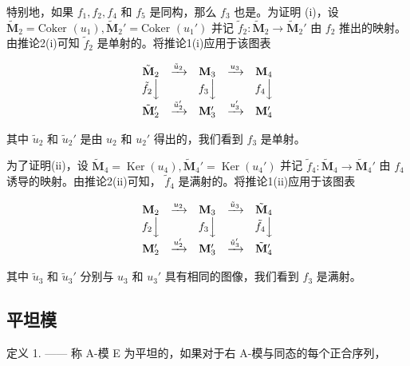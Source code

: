 特别地，如果 \(f_1, f_2, f_4\) 和 \(f_5\) 是同构，那么 \(f_3\) 也是。为证明 (i)，设 \(\tilde{\mathbf{M}}_2 = \text{Coker } (u_1), \tilde{\mathbf{M}}_2' = \text{Coker } (u_1')\) 并记 \(\tilde{f}_2: \tilde{\mathbf{M}}_2 \to \tilde{\mathbf{M}}_2'\) 由 \(f_2\) 推出的映射。由推论2(i)可知 \(\tilde{f}_2\) 是单射的。将推论1(i)应用于该图表

\[
\begin{array}{c c c c c} \tilde {\mathbf {M}} _ {2} & \xrightarrow {\tilde {u} _ {2}} & \mathbf {M} _ {3} & \xrightarrow {u _ {3}} & \mathbf {M} _ {4} \\ \tilde {f} _ {2} \Big \downarrow & & f _ {3} \Big \downarrow & & f _ {4} \Big \downarrow \\ \tilde {\mathbf {M}} _ {2} ^ {\prime} & \xrightarrow {\tilde {u} _ {2} ^ {\prime}} & \mathbf {M} _ {3} ^ {\prime} & \xrightarrow {u _ {3} ^ {\prime}} & \mathbf {M} _ {4} ^ {\prime} \end{array}
\]

其中 \(\tilde{u}_2\) 和 \(\tilde{u}_2'\) 是由 \(u_2\) 和 \(u_2'\) 得出的，我们看到 \(f_3\) 是单射。

为了证明(ii)，设 \(\tilde{\mathbf{M}}_{4} = \operatorname{Ker}(u_{4}), \tilde{\mathbf{M}}_{4}' = \operatorname{Ker}(u_{4}')\) 并记 \(\tilde{f}_{4}: \tilde{\mathbf{M}}_{4} \to \tilde{\mathbf{M}}_{4}'\) 由 \(f_{4}\) 诱导的映射。由推论2(ii)可知， \(\tilde{f}_{4}\) 是满射的。将推论1(ii)应用于该图表

\[
\begin{array}{c c c c c} \mathbf {M} _ {2} & \xrightarrow {u _ {2}} & \mathbf {M} _ {3} & \xrightarrow {\tilde {u} _ {3}} & \tilde {\mathbf {M}} _ {4} \\ f _ {2} \Big \downarrow & & f _ {3} \Big \downarrow & & \tilde {f} _ {4} \Big \downarrow \\ \mathbf {M} _ {2} ^ {\prime} & \xrightarrow {u _ {2} ^ {\prime}} & \mathbf {M} _ {3} ^ {\prime} & \xrightarrow {\tilde {u} _ {3} ^ {\prime}} & \tilde {\mathbf {M}} _ {4} ^ {\prime} \end{array}
\]

其中 \(\tilde{u}_3\) 和 \(\tilde{u}_3'\) 分别与 \(u_3\) 和 \(u_3'\) 具有相同的图像，我们看到 \(f_3\) 是满射。

\subsection{平坦模}

定义 1. —— 称 A-模 E 为平坦的，如果对于右 A-模与同态的每个正合序列，

